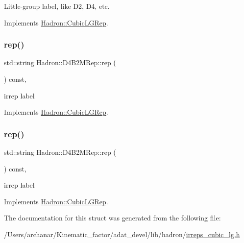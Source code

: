 Little-\/group label, like D2, D4, etc. 

Implements \mbox{\hyperlink{structHadron_1_1CubicLGRep_a9bdb14b519a611d21379ed96a3a9eb41}{Hadron\+::\+Cubic\+L\+G\+Rep}}.

\mbox{\label{structHadron_1_1D4B2MRep_ab0c418e49af7e2b749597e7b255d93f9}} 
\subsubsection{\texorpdfstring{rep()}{rep()}\hspace{0.1cm}{\footnotesize\ttfamily [1/2]}}
{\footnotesize\ttfamily std\+::string Hadron\+::\+D4\+B2\+M\+Rep\+::rep (\begin{DoxyParamCaption}{ }\end{DoxyParamCaption}) const\hspace{0.3cm}{\ttfamily [inline]}, {\ttfamily [virtual]}}

irrep label 

Implements \mbox{\hyperlink{structHadron_1_1CubicLGRep_a50f5ddbb8f4be4cee0106fa9e8c75e6c}{Hadron\+::\+Cubic\+L\+G\+Rep}}.

\mbox{\label{structHadron_1_1D4B2MRep_ab0c418e49af7e2b749597e7b255d93f9}} 
\subsubsection{\texorpdfstring{rep()}{rep()}\hspace{0.1cm}{\footnotesize\ttfamily [2/2]}}
{\footnotesize\ttfamily std\+::string Hadron\+::\+D4\+B2\+M\+Rep\+::rep (\begin{DoxyParamCaption}{ }\end{DoxyParamCaption}) const\hspace{0.3cm}{\ttfamily [inline]}, {\ttfamily [virtual]}}

irrep label 

Implements \mbox{\hyperlink{structHadron_1_1CubicLGRep_a50f5ddbb8f4be4cee0106fa9e8c75e6c}{Hadron\+::\+Cubic\+L\+G\+Rep}}.



The documentation for this struct was generated from the following file\+:\begin{DoxyCompactItemize}
\item 
/\+Users/archanar/\+Kinematic\+\_\+factor/adat\+\_\+devel/lib/hadron/\mbox{\hyperlink{lib_2hadron_2irreps__cubic__lg_8h}{irreps\+\_\+cubic\+\_\+lg.\+h}}\end{DoxyCompactItemize}
